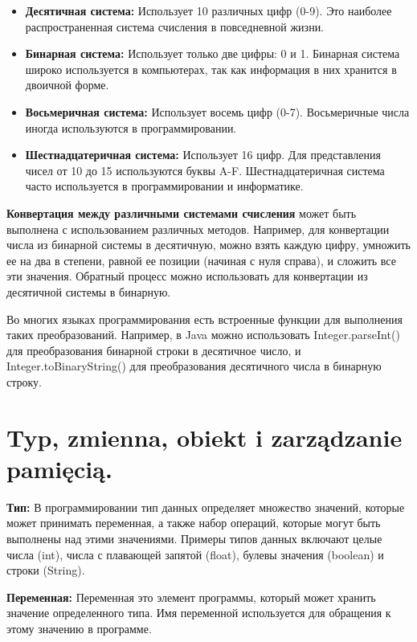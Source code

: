 \begin{itemize}
\item \textbf{Десятичная система:} Использует 10 различных цифр (0-9). Это наиболее распространенная система счисления в повседневной жизни.

\item \textbf{Бинарная система:} Использует только две цифры: 0 и 1. Бинарная система широко используется в компьютерах, так как информация в них хранится в двоичной форме.

\item \textbf{Восьмеричная система:} Использует восемь цифр (0-7). Восьмеричные числа иногда используются в программировании.

\item \textbf{Шестнадцатеричная система:} Использует 16 цифр. Для представления чисел от 10 до 15 используются буквы A-F. Шестнадцатеричная система часто используется в программировании и информатике.
\end{itemize}

\textbf{Конвертация между различными системами счисления} может быть выполнена с использованием различных методов. Например, для конвертации числа из бинарной системы в десятичную, можно взять каждую цифру, умножить ее на два в степени, равной ее позиции (начиная с нуля справа), и сложить все эти значения. Обратный процесс можно использовать для конвертации из десятичной системы в бинарную.

Во многих языках программирования есть встроенные функции для выполнения таких преобразований. Например, в Java можно использовать Integer.parseInt() для преобразования бинарной строки в десятичное число, и Integer.toBinaryString() для преобразования десятичного числа в бинарную строку.

\section{Typ, zmienna, obiekt i zarządzanie pamięcią.}

\textbf{Тип:} В программировании тип данных определяет множество значений, которые может принимать переменная, а также набор операций, которые могут быть выполнены над этими значениями. Примеры типов данных включают целые числа (int), числа с плавающей запятой (float), булевы значения (boolean) и строки (String).

\textbf{Переменная:} Переменная это элемент программы, который может хранить значение определенного типа. Имя переменной используется для обращения к этому значению в программе.

